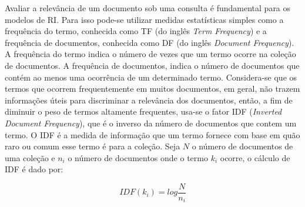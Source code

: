 

% 
% 
% 




Avaliar a relevância de um documento sob uma consulta é fundamental para os modelos de RI. Para isso pode-se utilizar medidas estatísticas simples como a frequência do termo, conhecida como TF (do inglês \textit{Term Frequency}) e a frequência de documentos, conhecida como DF (do inglês \textit{Document Frequency}). A frequência do termo indica o número de vezes que um termo ocorre na coleção de documentos. A frequência de documentos, indica o número de documentos que contém ao menos uma ocorrência de um determinado termo. Considera-se que os termos que ocorrem frequentemente em muitos documentos, em geral, não trazem informações úteis para discriminar a relevância dos documentos, então, a fim de diminuir o peso de termos altamente frequentes, usa-se o fator IDF (\textit{Inverted Document Frequency}), que é o inverso da número de documentos que contem um termo. O IDF é a medida de informação que um termo fornece com base em quão raro ou comum esse termo é para a coleção. Seja $N$ o número de documentos de uma coleção e $n_i$ o número de documentos onde o termo $k_i$ ocorre, o cálculo de IDF é dado por: 

	\begin{equation}
		IDF(k_i) = log\frac{N}{n_i}
		\label{equ:IDF}
	\end{equation}

